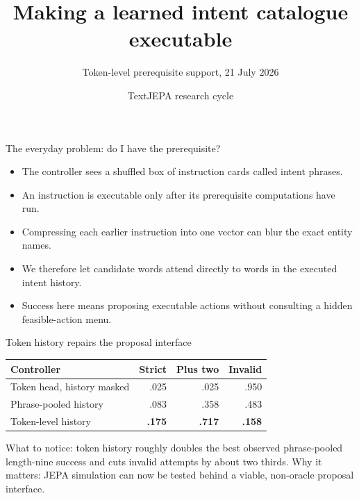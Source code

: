 \documentclass[aspectratio=169]{beamer}
\title{Making a learned intent catalogue executable}
\subtitle{Token-level prerequisite support, 21 July 2026}
\author{TextJEPA research cycle}
\date{}
\begin{document}
\maketitle

\begin{frame}{The everyday problem: do I have the prerequisite?}
  \begin{itemize}
    \item The controller sees a shuffled box of instruction cards called intent phrases.
    \item An instruction is executable only after its prerequisite computations have run.
    \item Compressing each earlier instruction into one vector can blur the exact entity names.
    \item We therefore let candidate words attend directly to words in the executed intent history.
    \item Success here means proposing executable actions without consulting a hidden feasible-action menu.
  \end{itemize}
\end{frame}

\begin{frame}{Token history repairs the proposal interface}
  \centering
  \begin{tabular}{lrrr}
    \toprule
    Controller & Strict & Plus two & Invalid\\
    \midrule
    Token head, history masked & .025 & .025 & .950\\
    Phrase-pooled history & .083 & .358 & .483\\
    Token-level history & \textbf{.175} & \textbf{.717} & \textbf{.158}\\
    \bottomrule
  \end{tabular}
  \vspace{1em}

  \begin{minipage}{0.9\linewidth}
  \small What to notice: token history roughly doubles the best observed
  phrase-pooled length-nine success and cuts invalid attempts by about two
  thirds. Why it matters: JEPA simulation can now be tested behind a viable,
  non-oracle proposal interface.
  \end{minipage}
\end{frame}
\end{document}
